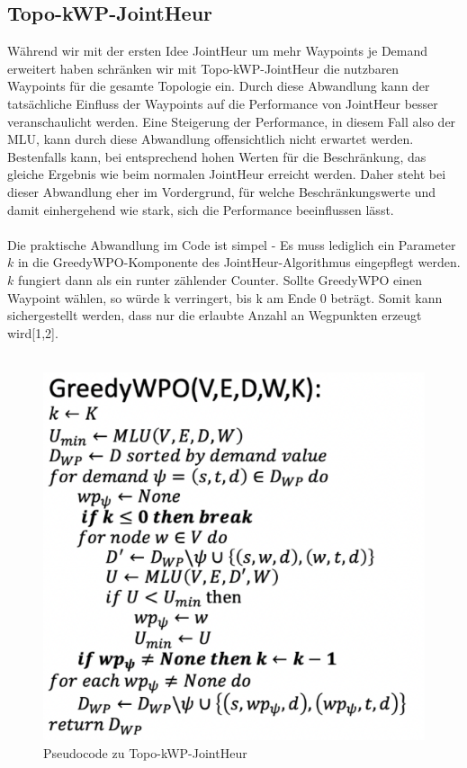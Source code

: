 \documentclass[sigconf,noacm,review]{acmart}
\begin{document}
\subsection{Topo-kWP-JointHeur}
Während wir mit der ersten Idee JointHeur um mehr Waypoints je Demand erweitert haben schränken wir mit Topo-kWP-JointHeur die nutzbaren Waypoints für die gesamte Topologie ein.
Durch diese Abwandlung kann der tatsächliche Einfluss der Waypoints auf die Performance von JointHeur besser veranschaulicht werden. Eine Steigerung der Performance, in diesem Fall also der MLU, kann durch diese Abwandlung offensichtlich nicht erwartet werden. 
Bestenfalls kann, bei entsprechend hohen Werten für die Beschränkung, das gleiche Ergebnis wie beim normalen JointHeur erreicht werden.
Daher steht bei dieser Abwandlung eher im Vordergrund, für welche Beschränkungswerte und damit einhergehend wie stark, sich die Performance beeinflussen lässt. \\
\\
Die praktische Abwandlung im Code ist simpel - Es muss lediglich ein Parameter $k$ in die 
GreedyWPO-Komponente des JointHeur-Algorithmus eingepflegt werden. $k$ fungiert dann als ein runter zählender Counter. Sollte GreedyWPO
einen Waypoint wählen, so würde k verringert, bis k am Ende 0 beträgt. Somit kann sichergestellt werden, dass nur die
erlaubte Anzahl an Wegpunkten erzeugt wird[1,2]. \\
\\
\begin{figure}[h]
  \centering
  \includegraphics[width=\linewidth]{abbildungen/pseudo2}
  \caption{Pseudocode zu Topo-kWP-JointHeur}
\end{figure}
\end{document}

